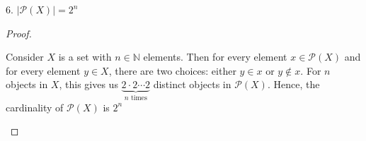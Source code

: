 \documentclass[11pt]{article}
\newcommand{\bproof}{\begin{proof}
$ $ \\
\begin{adjustwidth}{3em}{0pt}
}
\newcommand{\eproof}{\end{adjustwidth}
\end{proof}}
\begin{document}
\begin{flushleft}
\newpage

6. $| \mathcal{P}(X) | = 2^n$

\bproof

Consider $X$ is a set with $n \in \mathbb{N}$ elements. Then for every element $x \in \mathcal{P}(X)$ and for every element $y \in X$, there are two choices: either $y \in x$ or $y \notin x$. For $n$ objects in $X$, this gives us $\underbrace{2 \cdot 2 \cdots 2}_\text{$n$ times}$ distinct objects in $\mathcal{P}(X)$. Hence, the cardinality of $\mathcal{P}(X)$ is $2^n$

\eproof


\end{flushleft}
\end{document}
